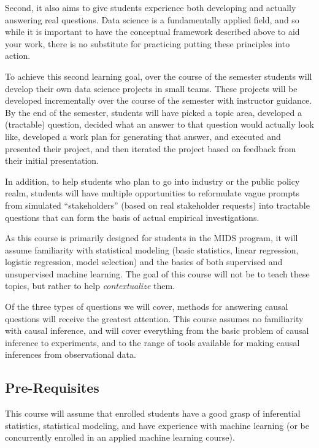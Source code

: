 \documentclass[12pt]{article}
\begin{document}
Second, it also aims to give students experience both developing and actually answering real questions. Data science is a fundamentally applied field, and so while it is important to have the conceptual framework described above to aid your work, there is no substitute for practicing putting these principles into action.

To achieve this second learning goal, over the course of the semester students will develop their own data science projects in small teams. These projects will be developed incrementally over the course of the semester with instructor guidance. By the end of the semester, students will have picked a topic area, developed a (tractable) question, decided what an answer to that question would actually look like, developed a work plan for generating that answer, and executed and presented their project, and then iterated the project based on feedback from their initial presentation.

In addition, to help students who plan to go into industry or the public policy realm, students will have multiple opportunities to reformulate vague prompts from simulated ``stakeholders'' (based on real stakeholder requests) into tractable questions that can form the basis of actual empirical investigations.

As this course is primarily designed for students in the MIDS program, it will assume familiarity with statistical modeling (basic statistics, linear regression, logistic regression, model selection) and the basics of both supervised and unsupervised machine learning. The goal of this course will not be to teach these topics, but rather to help \emph{contextualize} them.

Of the three types of questions we will cover, methods for answering causal questions will receive the greatest attention. This course assumes no familiarity with causal inference, and will cover everything from the basic problem of causal inference to experiments, and to the range of tools available for making causal inferences from observational data.


\subsection{Pre-Requisites}

This course will assume that enrolled students have a good grasp of inferential statistics, statistical modeling, and have experience with machine learning (or be concurrently enrolled in an applied machine learning course).
\end{document}
